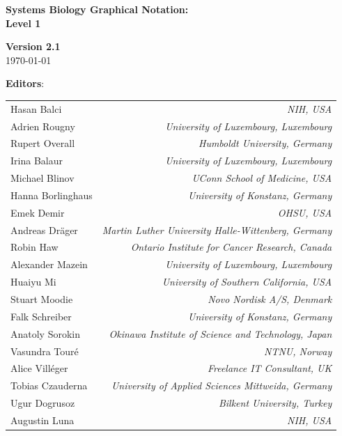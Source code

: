 \begin{titlepage}

\vspace*{0.75in}

\begin{center}

\textbf{\sffamily\bfseries\huge
Systems Biology Graphical Notation:\\[0.3em]
\PDl Level 1}

\vspace*{0.5in}

\Large
\textbf{Version 2.1}\\[0.1in]

\large
\today\\[0.25in]

\vspace{0.5in}

\textbf{\sffamily Editors}:\\[7pt]

\begin{tabular}{l>{\hspace*{15pt}}r}
Hasan Balci   & \emph{NIH, USA}\\
Adrien Rougny   & \emph{University of Luxembourg, Luxembourg}\\
Rupert Overall   & \emph{Humboldt University, Germany}\\
Irina Balaur & \emph{University of Luxembourg, Luxembourg}\\
Michael Blinov & \emph{UConn School of Medicine, USA}\\
Hanna Borlinghaus & \emph{University of Konstanz, Germany}\\
Emek Demir    & \emph{OHSU, USA}\\
Andreas Dräger   & \emph{Martin Luther University Halle-Wittenberg, Germany}\\
Robin Haw   & \emph{Ontario Institute for Cancer Research, Canada}\\
Alexander Mazein   & \emph{University of Luxembourg, Luxembourg}\\
Huaiyu Mi	& \emph{University of Southern California, USA}\\
Stuart Moodie   & \emph{Novo Nordisk A/S, Denmark}\\
Falk Schreiber	 & \emph{University of Konstanz, Germany}\\
Anatoly Sorokin   & \emph{Okinawa Institute of Science and Technology, Japan}\\ 
Vasundra Touré   & \emph{NTNU, Norway}\\
Alice Vill\'{e}ger   & \emph{Freelance IT Consultant, UK}\\
Tobias Czauderna   & \emph{University of Applied Sciences Mittweida, Germany}\\
Ugur Dogrusoz   & \emph{Bilkent University, Turkey}\\
Augustin Luna   & \emph{NIH, USA}\\
\end{tabular}


\end{center}
\end{titlepage}

